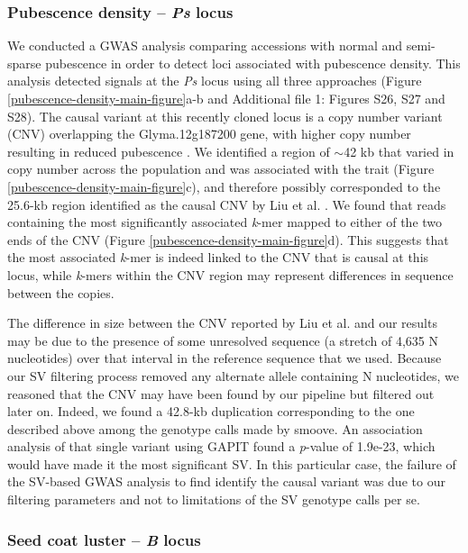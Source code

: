 \documentclass{article}
\begin{document}
\subsubsection*{Pubescence density -- \textit{Ps} locus}

We conducted a GWAS analysis comparing accessions with normal and semi-sparse
pubes\-cence in order to detect loci associated with pubescence density. This analysis
detected signals at the \textit{Ps} locus using all three approaches (Figure
\ref{pubescence-density-main-figure}a-b and Additional file 1: Figures S26, S27
and S28). The causal
variant at this recently cloned locus is a copy number variant (CNV) overlapping the
Glyma.12g187200 gene, with higher copy number resulting in reduced pubescence \citep{liu2020ps}.
We identified a region of $\sim$42 kb that varied in copy number across
the population and was associated with the trait (Figure
\ref{pubescence-density-main-figure}c), and therefore possibly corresponded to the
25.6-kb region identified as the causal CNV by Liu et al. \cite{liu2020ps}. We found that
reads containing the most significantly associated \textit{k}-mer mapped to either of the two ends
of the CNV (Figure \ref{pubescence-density-main-figure}d). This suggests that
the most associated \textit{k}-mer is indeed linked to the CNV
that is causal at this locus, while \textit{k}-mers within the
CNV region may represent differences in sequence between the copies.

The difference in size between the CNV reported by Liu et al. \cite{liu2020ps} and our
results may be due to the presence of some unresolved sequence (a stretch of
4,635 N nucleotides) over that interval in the reference sequence that we used.
Because our SV filtering process removed any alternate allele containing N nucleotides,
we reasoned that the CNV may have been found by our pipeline but
filtered out later on. Indeed, we found a 42.8-kb duplication corresponding
to the one described above among the genotype calls made by smoove. An association
analysis of that single variant using GAPIT found a \textit{p}-value of 1.9e-23,
which would have made it the most significant SV. In this particular case, the
failure of the SV-based GWAS analysis to find identify the causal variant was due
to our filtering parameters and not to limitations of the SV genotype calls per se.

\subsubsection*{Seed coat luster -- \textit{B} locus}
\end{document}
